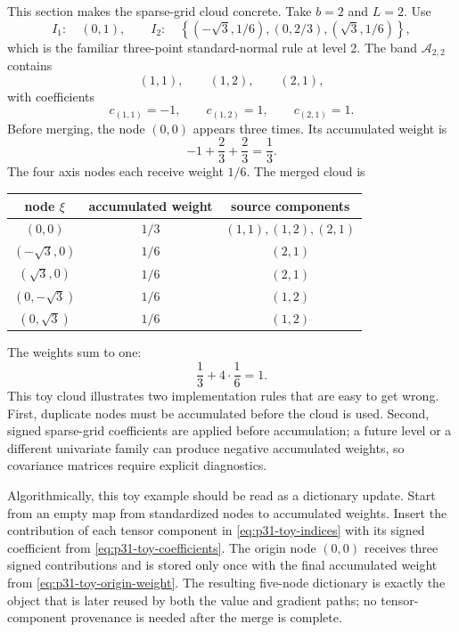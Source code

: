 \documentclass[11pt]{article}
\numberwithin{equation}{section}
\begin{document}
This section makes the sparse-grid cloud concrete.  Take \(b=2\) and \(L=2\).
Use
\begin{equation}
  I_1:\quad (0,1),
  \qquad
  I_2:\quad
  \left\{(-\sqrt3,1/6),(0,2/3),(\sqrt3,1/6)\right\},
  \label{eq:p31-toy-univariate}
\end{equation}
which is the familiar three-point standard-normal rule at level 2.  The band
\(\mathcal A_{2,2}\) contains
\begin{equation}
  (1,1),\qquad (1,2),\qquad (2,1),
  \label{eq:p31-toy-indices}
\end{equation}
with coefficients
\begin{equation}
  c_{(1,1)}=-1,\qquad c_{(1,2)}=1,\qquad c_{(2,1)}=1.
  \label{eq:p31-toy-coefficients}
\end{equation}
Before merging, the node \((0,0)\) appears three times.  Its accumulated weight
is
\begin{equation}
  -1+\frac23+\frac23=\frac13.
  \label{eq:p31-toy-origin-weight}
\end{equation}
The four axis nodes each receive weight \(1/6\).  The merged cloud is
\begin{center}
\begin{tabular}{ccc}
\toprule
node \(\xi\) & accumulated weight & source components \\
\midrule
\((0,0)\) & \(1/3\) & \((1,1),(1,2),(2,1)\) \\
\((-\sqrt3,0)\) & \(1/6\) & \((2,1)\) \\
\((\sqrt3,0)\) & \(1/6\) & \((2,1)\) \\
\((0,-\sqrt3)\) & \(1/6\) & \((1,2)\) \\
\((0,\sqrt3)\) & \(1/6\) & \((1,2)\) \\
\bottomrule
\end{tabular}
\end{center}
The weights sum to one:
\begin{equation}
  \frac13+4\cdot\frac16=1.
  \label{eq:p31-toy-weight-total}
\end{equation}
This toy cloud illustrates two implementation rules that are easy to get
wrong.  First, duplicate nodes must be accumulated before the cloud is used.
Second, signed sparse-grid coefficients are applied before accumulation; a
future level or a different univariate family can produce negative accumulated
weights, so covariance matrices require explicit diagnostics.

Algorithmically, this toy example should be read as a dictionary update.  Start
from an empty map from standardized nodes to accumulated weights.  Insert the
contribution of each tensor component in \eqref{eq:p31-toy-indices} with its
signed coefficient from \eqref{eq:p31-toy-coefficients}.  The origin node
\((0,0)\) receives three signed contributions and is stored only once with the
final accumulated weight from \eqref{eq:p31-toy-origin-weight}.  The resulting
five-node dictionary is exactly the object that is later reused by both the
value and gradient paths; no tensor-component provenance is needed after the
merge is complete.
\end{document}
